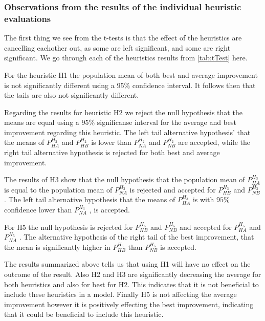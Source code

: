 \documentclass[../main.tex]{subfiles}
\begin{document}
\subsubsection{Observations from the results of the individual heuristic evaluations}
The first thing we see from the t-tests is that the effect of the heuristics are cancelling eachother out, as some are left significant, and some are right significant.
We go through each of the heuristics results from \cref{tab:tTest} here. \par
For the heuristic H1 the population mean of both best and average improvement is not significantly different using a $95\%$ confidence interval. It follows then that the tails are also not significantly different. \par
Regarding the results for heuristic H2 we reject the null hypothesis that the means are equal using a $95\%$ significanse interval for the average and best improvement regarding this heuristic. 
The left tail alternative hypothesis' that the means of $P^{H_2}_{HA}$ and $P^{H_2}_{HB}$ is lower than $P^{H_2}_{NA}$ and $P^{H_2}_{NB}$ are accepted, while the right tail alternative hypothesis is rejected for both best and average improvement.\par 
The results of H3 show that the null hypothesis that the population mean of $P^{H_3}_{HA}$ is equal to the population mean of $P^{H_3}_{NA}$ is rejected and accepted for $P^{H_3}_{HB}$ and $P^{H_3}_{NB}$. The left tail alternative hypothesis that the means of $P^{H_3}_{HA}$ is with $95\%$ confidence lower than $P^{H_3}_{NA}$ , is accepted.\par 
For H5 the null hypothesis is rejected for  $P^{H_5}_{HB}$ and  $P^{H_5}_{NB}$ and accepted for $P^{H_5}_{HA}$ and $P^{H_5}_{NA}$ . 
The alternative hypothesis of the right tail of the best improvement, that the mean is significantly higher in $P^{H_5}_{HB}$ than  $P^{H_5}_{NB}$ is accepted.

The results summarized above tells us that using H1 will have no effect on the outcome of the result. 
Also H2 and H3 are significantly decreasing the average for both heuristics and also for best for H2. 
This indicates that it is not beneficial to include these heuristics in a model.
Finally H5 is not affecting the average improvement however it is positively effecting the best improvement, indicating that it could be beneficial to include this heuristic.
\end{document}
